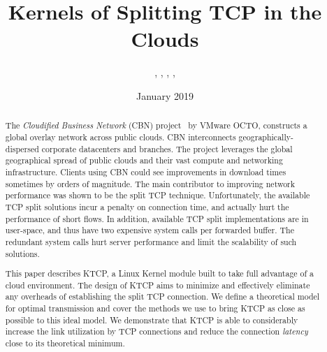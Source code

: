 \documentclass[newfonts=false,format=sigconf,9pt,letterpaper]{acmart}
\title{Kernels of Splitting TCP in the Clouds}
\author{\aut{Alex Markuze}{1,2}, \aut{Aran Bergman}{1}, \aut{Chen Dar}{1}, \aut{Isaac Keslassy}{1,2},
        \aut{Israel Cidon}{1,2}}
\affiliation{%
  \institution{$^1$VMware Research\quad $^2$Technion\quad}
}
\date{January 2019}
\newcommand{\oursys}{KTCP\xspace}
\newcommand{\mycomm}[3]{{\footnotesize{{\color{#2} \textbf{[#1: #3]}}}}}
\newcommand{\IK}[1]{\mycomm{IK}{blue}{#1}}
\newcommand{\AB}[1]{\mycomm{AB}{darkgreen}{#1}}
\begin{document}
\begin{abstract}
The \emph{Cloudified Business Network} (CBN) project~\cite{Elastic, CDD} by VMware OCTO, 
constructs a global overlay network across public clouds. CBN interconnects geographically-dispersed corporate datacenters and branches. The project leverages the global geographical spread of public clouds and their vast compute and networking infrastructure.
Clients using CBN could see improvements in download times sometimes by orders of magnitude.
The main contributor to improving network performance was shown to be the split TCP technique. 
Unfortunately, the available TCP split solutions incur a penalty on connection time, and actually hurt the performance of short flows. In addition, available TCP split implementations are in user-space, and thus have two expensive system calls per forwarded buffer. The redundant system calls hurt server performance and limit the scalability of such solutions. 

This paper describes \oursys, a Linux Kernel module built to take full advantage of a cloud environment.  
The design of \oursys aims to minimize and effectively eliminate any overheads of establishing the split TCP connection. We define a theoretical model for optimal transmission and cover the methods we use to bring \oursys as close as possible to this ideal model. We demonstrate that \oursys is able to considerably increase the link utilization by TCP connections and reduce the connection \emph{latency} close to its theoretical minimum.
\end{abstract}

\maketitle
\sloppypar








\end{document}
